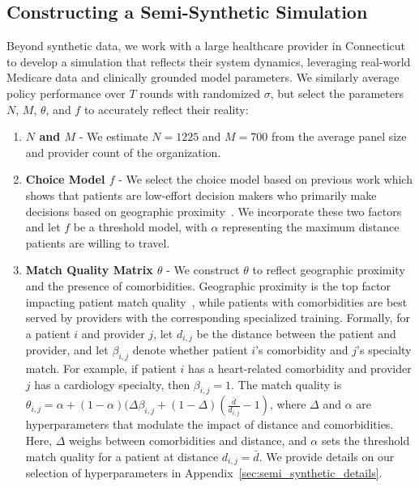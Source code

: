 \documentclass[11pt]{article}
\begin{document}
\subsection{Constructing a Semi-Synthetic Simulation}
\label{sec:semi_synthetic_data}
Beyond synthetic data, we work with a large healthcare provider in Connecticut to develop a simulation that reflects their system dynamics, leveraging real-world Medicare data and clinically grounded model parameters. 
We similarly average policy performance over $T$ rounds with randomized $\sigma$, but select the parameters $N$, $M$, $\theta$, and $f$ to accurately reflect their reality: 
\begin{enumerate}
    \item \textbf{$N$ and $M$} - We estimate $N=1225$ and $M=700$ from the average panel size and provider count of the organization.
    \item \textbf{Choice Model $f$} - We select the choice model based on previous work which shows that patients are low-effort decision makers who primarily make decisions based on geographic proximity~\citep{choosing_doctor,distance_rural}.
    We incorporate these two factors and let $f$ be a threshold model, with $\alpha$ representing the maximum distance patients are willing to travel. 
    \item \textbf{Match Quality Matrix $\theta$} - We construct $\theta$ to reflect  geographic proximity and the presence of comorbidities. 
    Geographic proximity is the top factor impacting patient match quality~\citep{washington_distance,distance_rural}, while patients with comorbidities are best served by providers with the corresponding specialized training. 
    Formally, for a patient $i$ and provider $j$, let $d_{i,j}$ be the distance between the patient and provider, and let $\beta_{i,j}$ denote whether patient $i$'s comorbidity and $j$'s specialty match.  
    For example, if patient $i$ has a heart-related comorbidity and provider $j$ has a cardiology specialty, then $\beta_{i,j}=1$. 
    The match quality is $\theta_{i,j} = \alpha + (1-\alpha)(\Delta \beta_{i,j} + (1-\Delta)(\frac{\bar{d}}{d_{i,j}}-1)$, where $\Delta$ and $\alpha$ are hyperparameters that modulate the impact of distance and comorbidities. 
    Here, $\Delta$ weighs between comorbidities and distance, and $\alpha$ sets the threshold match quality for a patient at distance $d_{i,j} = \bar{d}$.
    We provide details on our selection of hyperparameters in Appendix~\ref{sec:semi_synthetic_details}. 
\end{enumerate}
\end{document}
